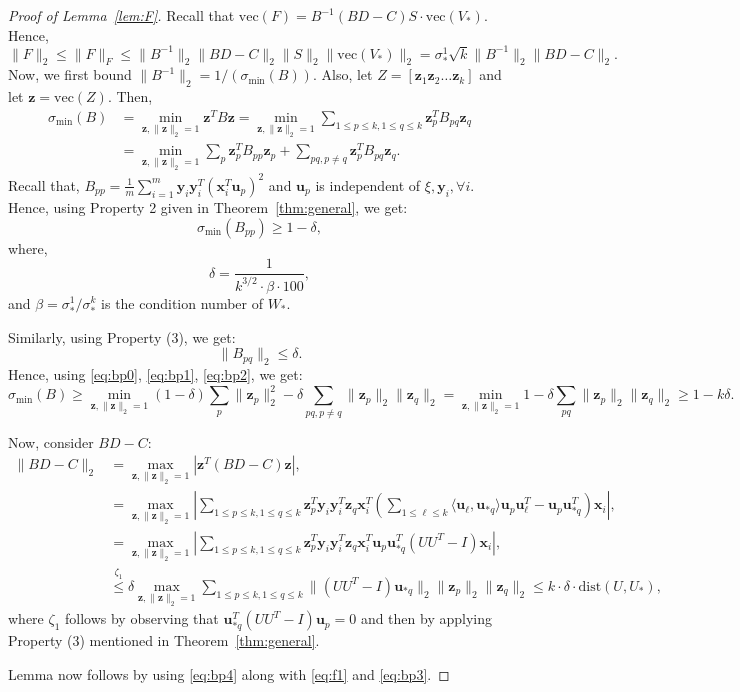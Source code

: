 \documentclass[11pt]{article}
\newcommand{\mvec}{\mathrm{vec}}
\newcommand{\tp}[1]{{#1}^{T}}
\newcommand{\dist}{\mathrm{dist}}
\renewcommand{\u}{\bm{u}}
\newcommand{\Vo}{V_*}
\newcommand{\Uo}{U_*}
\newcommand{\so}{\sigma_*}
\newcommand{\ip}[2]{\langle #1, #2 \rangle}
\newcommand{\Wo}{W_*}
\newcommand{\z}{\bm{z}}
\newcommand{\x}{\bm{x}}
\newcommand{\y}{\bm{y}}
\newcommand{\xit}{\tp{\x}_i}
\newcommand{\yi}{\y_i}
\newcommand{\yit}{\tp{\y}_i}
\begin{document}
\begin{proof}[Proof of Lemma~\ref{lem:F}]
Recall that $\mvec(F)=B^{-1}(BD-C)S\cdot \mvec(\Vo)$. Hence, 
\begin{equation}\label{eq:f1}\|F\|_2\leq \|F\|_F\leq \|B^{-1}\|_2\|BD-C\|_2\|S\|_2\|\mvec(\Vo)\|_2=\so^1\sqrt{k}\|B^{-1}\|_2\|BD-C\|_2.\end{equation}
Now, we first bound $\|B^{-1}\|_2=1/(\sigma_{\text{min}}(B))$. 
Also, let $Z=[\z_1 \z_2 \dots \z_k]$ and let $\z=\mvec(Z)$. Then, 
\begin{align}
  \sigma_{\text{min}}(B)&=\min_{\z, \|\z\|_2=1}\z^TB\z=\min_{\z, \|\z\|_2=1}\sum_{1\leq p\leq k, 1\leq q\leq k}\z_p^TB_{pq}\z_q\nonumber\\&=\min_{\z, \|\z\|_2=1}\sum_{p}\z_p^TB_{pp}\z_p+\sum_{pq, p\neq q}\z_p^TB_{pq}\z_q. \label{eq:bp0}
\end{align}
Recall that, $B_{pp}=\frac{1}{m}\sum_{i=1}^m \yi\yit (\xit\u_p)^2$ and $\u_p$ is independent of $\xi, \yi, \forall i$. Hence, using Property 2 given in Theorem~\ref{thm:general}, we get: 
\begin{equation}
  \label{eq:bp1}
  \sigma_{\text{min}}(B_{pp})\geq 1- \delta,
\end{equation}
where, $$\delta=\frac{1}{k^{3/2}\cdot \beta\cdot 100},$$ and $\beta=\so^1/\so^k$ is the condition number of $\Wo$. 

Similarly, using Property (3), we get: 
\begin{equation}
  \label{eq:bp2}
  \|B_{pq}\|_2\leq \delta. 
\end{equation}
Hence, using \eqref{eq:bp0}, \eqref{eq:bp1}, \eqref{eq:bp2}, we get:
\begin{equation}
  \label{eq:bp3}
  \sigma_{\text{min}}(B)\geq \min_{\z, \|\z\|_2=1}(1-\delta)\sum_{p}\|\z_p\|_2^2-\delta\sum_{pq, p\neq q}\|\z_p\|_2\|\z_q\|_2=\min_{\z, \|\z\|_2=1}1-\delta\sum_{pq}\|\z_p\|_2\|\z_q\|_2\geq 1-k\delta. 
\end{equation}

Now, consider $BD-C$: 
\begin{align}
  \|BD-C\|_2&= \max_{\z, \|\z\|_2=1}|\z^T(BD-C)\z|,\nonumber\\
&=\max_{\z, \|\z\|_2=1}\left|\sum_{1\leq p\leq k, 1\leq q\leq k}\z_p^T\yi\yit\z_q\xit\left(\sum_{1\leq \ell\leq k}\ip{\u_\ell}{\u_{*q}}\u_p\u_\ell^T-\u_{p}\u_{*q}^T\right)\x_i\right|,\nonumber\\
&=\max_{\z, \|\z\|_2=1}\left|\sum_{1\leq p\leq k, 1\leq q\leq k}\z_p^T\yi\yit\z_q\xit\u_p\u_{*q}^T(UU^T-I)\x_i\right|,\nonumber\\
&\stackrel{\zeta_1}{\leq}\delta \max_{\z, \|\z\|_2=1} \sum_{1\leq p\leq k, 1\leq q\leq k} \|(UU^T-I)\u_{*q}\|_2\|\z_p\|_2\|\z_q\|_2\leq k\cdot \delta\cdot \dist(U, \Uo),\label{eq:bp4}
\end{align}
where $\zeta_1$ follows by observing that $\u_{*q}^T(UU^T-I) \u_p=0$ and then by applying Property (3) mentioned in Theorem~\ref{thm:general}. 

Lemma now follows by using \eqref{eq:bp4} along with  \eqref{eq:f1} and \eqref{eq:bp3}. 
\end{proof}
\end{document}
